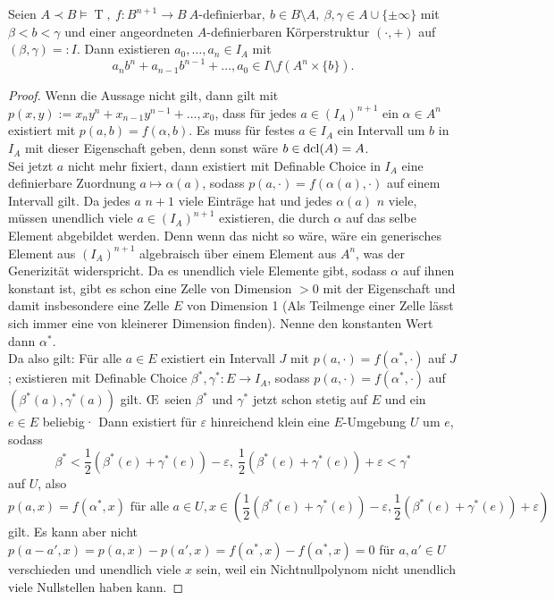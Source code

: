 \begin{lemma}\label{Hilfsaussage Kleinheit}
	Seien $A\prec B\models\operatorname{T},\ f:B^{n+1}\rightarrow B\ A\text{-definierbar},\ b\in B\setminus A,\ \beta,\gamma\in A\cup\{\pm\infty\}$ mit $\beta<b<\gamma$ und einer angeordneten $A$-definierbaren Körperstruktur $(\cdot,+)$ auf $(\beta,\gamma)=:I$. Dann existieren $a_0,\dots,a_n\in I_A$ mit $$a_nb^n+a_{n-1}b^{n-1}+\dots,a_0\in I\setminus f(A^n\times\{b\}).$$
\end{lemma}
\begin{proof}
	Wenn die Aussage nicht gilt, dann gilt mit $p(x,y):=x_ny^n+x_{n-1}y^{n-1}+\dots,x_0$, dass für jedes $a\in (I_A)^{n+1}$ ein $\alpha\in A^n$ existiert mit $p(a,b)=f(\alpha,b)$. Es muss für festes $a\in I_A$ ein Intervall um $b$ in $I_A$ mit dieser Eigenschaft geben, denn sonst wäre $b\in\operatorname{dcl}(A)=A$.\\
	Sei jetzt $a$ nicht mehr fixiert, dann existiert mit Definable Choice in $I_A$ eine definierbare Zuordnung $a\mapsto\alpha(a)$, sodass $p(a,\cdot)=f(\alpha(a),\cdot)$ auf einem Intervall gilt. Da jedes $a$ $n+1$ viele Einträge hat und jedes $\alpha(a)$ $n$ viele, müssen unendlich viele $a\in (I_A)^{n+1}$ existieren, die durch $\alpha$ auf das selbe Element abgebildet werden. Denn wenn das nicht so wäre, wäre ein generisches Element aus $(I_A)^{n+1}$ algebraisch über einem Element aus $A^n$, was der Generizität widerspricht. Da es unendlich viele Elemente gibt, sodass $\alpha$ auf ihnen konstant ist, gibt es schon eine Zelle von Dimension $>0$ mit der Eigenschaft und damit insbesondere eine Zelle $E$ von Dimension 1 (Als Teilmenge einer Zelle lässt sich immer eine von kleinerer Dimension finden). Nenne den konstanten Wert dann $\alpha^*$.\\
	Da also gilt: Für alle $a\in E$ existiert ein Intervall $J$ mit $p(a,\cdot)=f(\alpha^*,\cdot)$ auf $J$; existieren mit Definable Choice $\beta^*,\gamma^*:E\rightarrow I_A$, sodass $p(a,\cdot)=f(\alpha^*,\cdot)$ auf $(\beta^*(a),\gamma^*(a))$ gilt. \OE\ seien $\beta^*$ und $\gamma^*$ jetzt schon stetig auf $E$ und ein $e\in E$ beliebig· Dann existiert für $\varepsilon$ hinreichend klein eine $E$-Umgebung $U$ um $e$, sodass $$\beta^*<\frac{1}{2}(\beta^*(e)+\gamma^*(e))-\varepsilon,\ \frac{1}{2}(\beta^*(e)+\gamma^*(e))+\varepsilon<\gamma^*$$ auf $U$, also $$p(a,x)=f(\alpha^*,x)\text{ für alle }a\in U,x\in(\frac{1}{2}(\beta^*(e)+\gamma^*(e))-\varepsilon,\frac{1}{2}(\beta^*(e)+\gamma^*(e))+\varepsilon)$$ gilt. Es kann aber nicht $p(a-a',x)=p(a,x)-p(a',x)=f(\alpha^*,x)-f(\alpha^*,x)=0$ für $a,a'\in U$ verschieden und unendlich viele $x$ sein, weil ein Nichtnullpolynom nicht unendlich viele Nullstellen haben kann.
\end{proof}

